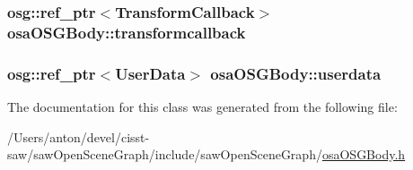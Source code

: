 \subsubsection[{transformcallback}]{\setlength{\rightskip}{0pt plus 5cm}osg\+::ref\+\_\+ptr$<${\bf Transform\+Callback}$>$ osa\+O\+S\+G\+Body\+::transformcallback\hspace{0.3cm}{\ttfamily [protected]}}\label{classosa_o_s_g_body_a8d4d3d23660fa1fbd6cdfec7e2541a14}
\hypertarget{classosa_o_s_g_body_aaaa048aa92048243a7bf355e6d178ec1}{}
\subsubsection[{userdata}]{\setlength{\rightskip}{0pt plus 5cm}osg\+::ref\+\_\+ptr$<${\bf User\+Data}$>$ osa\+O\+S\+G\+Body\+::userdata\hspace{0.3cm}{\ttfamily [protected]}}\label{classosa_o_s_g_body_aaaa048aa92048243a7bf355e6d178ec1}


The documentation for this class was generated from the following file\+:\begin{DoxyCompactItemize}
\item 
/\+Users/anton/devel/cisst-\/saw/saw\+Open\+Scene\+Graph/include/saw\+Open\+Scene\+Graph/\hyperlink{osa_o_s_g_body_8h}{osa\+O\+S\+G\+Body.\+h}\end{DoxyCompactItemize}
